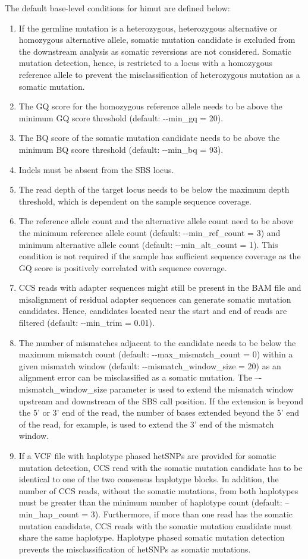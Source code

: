 The default base-level conditions for himut are defined below: 

\begin{enumerate}
\item If the germline mutation is a heterozygous, heterozygous alternative or homozygous alternative allele, somatic mutation candidate is excluded from the downstream analysis as somatic reversions are not considered. Somatic mutation detection, hence, is restricted to a locus with a homozygous reference allele to prevent the misclassification of heterozygous mutation as a somatic mutation.
\item The GQ score for the homozygous reference allele needs to be above the minimum GQ score threshold (default: -{}-min\_gq = 20).
\item The BQ score of the somatic mutation candidate needs to be above the minimum BQ score threshold (default: -{}-min\_bq = 93).
\item Indels must be absent from the SBS locus.
\item The read depth of the target locus needs to be below the maximum depth threshold, which is dependent on the sample sequence coverage. 
\item The reference allele count and the alternative allele count need to be above the minimum reference allele count (default: -{}-min\_ref\_count = 3) and minimum alternative allele count (default: -{}-min\_alt\_count = 1). This condition is not required if the sample has sufficient sequence coverage as the GQ score is positively correlated with sequence coverage.
\item CCS reads with adapter sequences might still be present in the BAM file and misalignment of residual adapter sequences can generate somatic mutation candidates. Hence, candidates located near the start and end of reads are filtered  (default: -{}-min\_trim = 0.01).
\item The number of mismatches adjacent to the candidate needs to be below the maximum mismatch count (default: -{}-max\_mismatch\_count = 0) within a given mismatch window (default: -{}-mismatch\_window\_size = 20) as an alignment error can be misclassified as a somatic mutation. The –{}-mismatch\_window\_size parameter is used to extend the mismatch window upstream and downstream of the SBS call position. If the extension is beyond the 5’ or 3’ end of the read, the number of bases extended beyond the 5’ end of the read, for example, is used to extend the 3’ end of the mismatch window.
\item If a VCF file with haplotype phased hetSNPs are provided for somatic mutation detection, CCS read with the somatic mutation candidate has to be identical to one of the two consensus haplotype blocks. In addition, the number of CCS reads, without the somatic mutations, from both haplotypes must be greater than the minimum number of haplotype count (default: --min\_hap\_count = 3). Furthermore, if more than one read has the somatic mutation candidate, CCS reads with the somatic mutation candidate must share the same haplotype. Haplotype phased somatic mutation detection prevents the misclassification of hetSNPs as somatic mutations. 

\end{enumerate}
